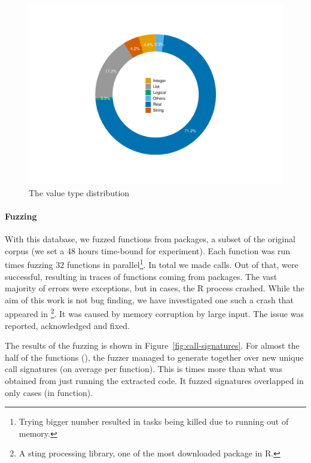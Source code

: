 \documentclass[sigplan,anonymous,review]{acmart}
\begin{document}
\begin{figure}
    \centering
    \includegraphics[width=\columnwidth]{code-and-figures/argsdb-value-distribution.pdf}
    \caption{The \sxpdb value type distribution}
    \label{fig:argsdb-value-distribution}
\end{figure}

\paragraph{Fuzzing}

With this database, we fuzzed \UFNumFunctions functions from \UFNumPackages packages, a subset of the original corpus (we set a 48 hours time-bound for experiment).
Each function was run \UFTracingBudget times fuzzing 32 functions in parallel\footnote{Trying bigger number resulted in tasks being killed due to running out of memory.}.
In total we made \UFNumTracesRnd calls. Out of that, \UFRatioSuccessTraces were successful, resulting in \UFNumSuccessTraces traces of \UFNumSuccessFunctions functions coming from \UFNumSuccessPackages packages.
The vast majority of errors were exceptions, but in \UFNumOfCrashedRSessions cases, the R process crashed.
While the aim of this work is not bug finding, we have investigated one such a crash that appeared in \footnote{A sting processing library, one of the most downloaded package in R.}.
It was caused by memory corruption by large input.
The issue was reported, acknowledged and fixed.

The results of the fuzzing is shown in Figure~\ref{fig:call-signatures}.
For almost the half of the functions (\UFNumFunctionSignatrSignatureRatio), the fuzzer managed to generate together over \UFSignatrSignaturesRnd new unique call signatures (on average \UFAvgNewSignatrSignature per function).
This is \UFSignatrBaselineSignaturesRatio times more than what was obtained from just running the extracted code.
It fuzzed signatures overlapped in only \UFSharedSignature cases (in \UFSharedSignatureFunction function).
\end{document}
